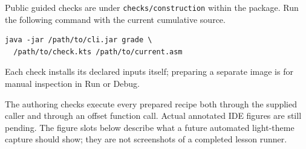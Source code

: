 Public guided checks are under \texttt{checks/construction} within the package. Run
the following command with the current cumulative source.
\begin{verbatim}
java -jar /path/to/cli.jar grade \
  /path/to/check.kts /path/to/current.asm
\end{verbatim}
 Each check installs its declared inputs itself;
preparing a separate image is for manual inspection in Run or Debug.

The authoring checks execute every prepared recipe both through the supplied
caller and through an offset function call. Actual annotated IDE figures are still
pending. The figure slots below describe what a future automated light-theme capture
should show; they are not screenshots of a completed lesson runner.
